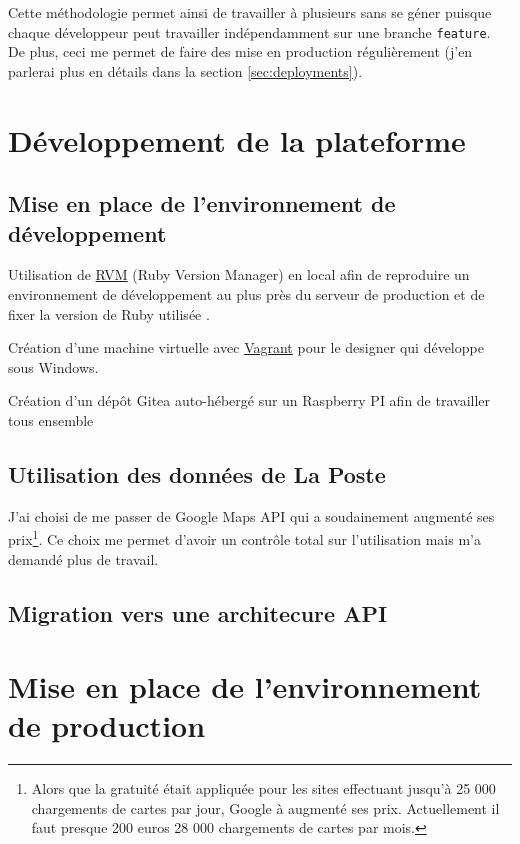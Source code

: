 \documentclass[]{report}
\begin{document}
    Cette méthodologie permet ainsi de travailler à plusieurs sans se géner puisque chaque développeur peut travailler indépendamment sur une branche \verb|feature|. De plus, ceci me permet de faire des mise en production régulièrement (j'en parlerai plus en détails dans la section \ref{sec:deployments}).

\chapter{Développement de la plateforme}


  \section{Mise en place de l'environnement de développement}

    Utilisation de \href{https://rvm.io}{RVM} (Ruby Version Manager) en local afin de reproduire un environnement de développement au plus près du serveur de production et de fixer la version de Ruby utilisée .

    Création d'une machine virtuelle avec \href{https://www.vagrantup.com}{Vagrant} pour le designer qui développe sous Windows.

    Création d'un dépôt Gitea auto-hébergé sur un Raspberry PI afin de travailler tous ensemble

  \section{Utilisation des données de La Poste}

    J'ai choisi  de me passer de Google Maps API qui a soudainement augmenté ses prix\footnote{Alors que la gratuité était appliquée pour les sites effectuant jusqu'à 25 000 chargements de cartes par jour, Google à augmenté ses prix. Actuellement il faut presque 200 euros 28 000 chargements de cartes par mois.}. Ce choix me permet d'avoir un contrôle total sur l'utilisation mais m'a demandé plus de travail.

  \section{Migration vers une architecure API}


\chapter{Mise en place de l’environnement de production}
\end{document}
